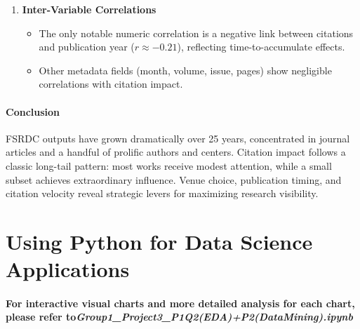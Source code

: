 \documentclass[12pt]{article}
\begin{document}
\begin{enumerate}
  \item \textbf{Inter-Variable Correlations}
    \begin{itemize}
      \item The only notable numeric correlation is a negative link between citations and publication year (\(r\approx -0.21\)), reflecting time-to-accumulate effects.
      \item Other metadata fields (month, volume, issue, pages) show negligible correlations with citation impact.
    \end{itemize}
\end{enumerate}

\paragraph*{Conclusion}
FSRDC outputs have grown dramatically over 25 years, concentrated in journal articles and a handful of prolific authors and centers. Citation impact follows a classic long-tail pattern: most works receive modest attention, while a small subset achieves extraordinary influence. Venue choice, publication timing, and citation velocity reveal strategic levers for maximizing research visibility.


\section{Using Python for Data Science Applications}
\paragraph{\textbf{For interactive visual charts and more detailed analysis for each chart, please refer to\textit{Group1\_Project3\_P1Q2(EDA)+P2(DataMining).ipynb}}}\
\end{document}
